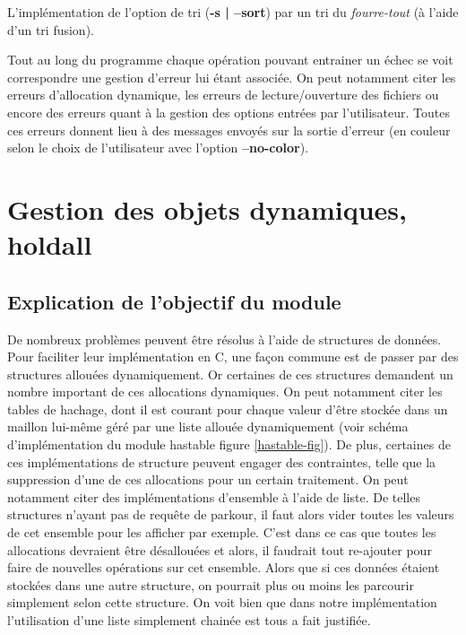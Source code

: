 \documentclass[12pt]{article}
\begin{document}
    L'implémentation de l'option de tri (\textbf{-s | --sort}) par un tri du 
    \textit{fourre-tout} (à l'aide d'un tri fusion).

    Tout au long du programme chaque opération pouvant entrainer un échec se 
    voit correspondre une gestion d'erreur lui étant associée. On peut notamment 
    citer les erreurs d'allocation dynamique, les erreurs de lecture/ouverture 
    des fichiers ou encore des erreurs quant à la gestion des options entrées
    par l'utilisateur. Toutes ces erreurs donnent lieu à des messages envoyés 
    sur la sortie d'erreur (en couleur selon le choix de l'utilisateur avec 
    l'option \textbf{--no-color}).

    \newpage

    \section{Gestion des objets dynamiques, holdall}\label{holdall}

    \subsection{Explication de l'objectif du module}
    
    De nombreux problèmes peuvent être résolus à l'aide de structures de 
    données. Pour faciliter leur implémentation en C, une façon commune est de 
    passer par des structures allouées dynamiquement. Or certaines de ces 
    structures demandent un nombre important de ces allocations dynamiques. On 
    peut notamment citer les tables de hachage, dont il est courant pour chaque 
    valeur d'être stockée dans un maillon lui-même géré par une liste allouée 
    dynamiquement (voir schéma d'implémentation du module hastable figure 
    \ref{hastable-fig}). De plus, certaines de ces implémentations de structure 
    peuvent engager des contraintes, telle que la suppression d'une de ces 
    allocations pour un certain traitement. On peut notamment citer des 
    implémentations d'ensemble à l'aide de liste. De telles structures n'ayant 
    pas de requête de parkour, il faut alors vider toutes les valeurs de cet 
    ensemble pour les afficher par exemple. C'est dans ce cas que toutes les 
    allocations devraient être désallouées et alors, il  faudrait tout
    re-ajouter pour faire de nouvelles opérations sur cet ensemble. Alors que si 
    ces données étaient stockées dans une autre structure, on pourrait plus ou 
    moins les parcourir simplement selon cette structure. On voit bien que dans 
    notre implémentation l'utilisation d'une liste simplement chainée est tous a 
    fait justifiée.
\end{document}
